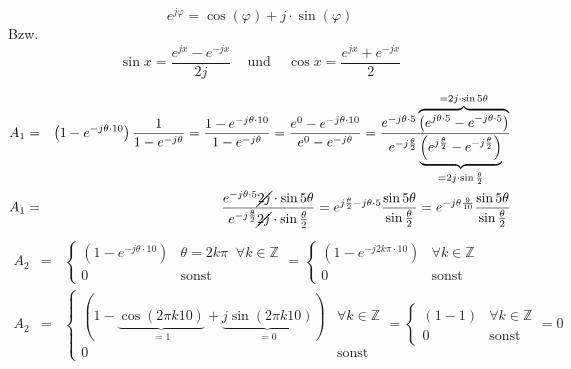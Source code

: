 \begin{uebsp}
\begin{Answer}
\begin{enumerate}[a)]
                \begin{definition}
                    \[e^{j\varphi}=\cos(\varphi)+j\cdot\sin(\varphi)\]
                    Bzw. 
                    \[\sin x = \frac{e^{jx} - e^{-jx}}{2j}\;\;\;\text{ und
                        }\;\;\;\cos x = \frac{e^{jx} + e^{-jx}}{2}\]
                \end{definition}
                \begin{eqnarray*}A_1&=&\left(1-e^{-j\theta\cdot
                10}\right)\frac{1}{1-e^{-j\theta}}=\frac{1-e^{-j\theta\cdot
                10}}{1-e^{-j\theta}}=\frac{e^0-e^{-j\theta\cdot
                10}}{e^0-e^{-j\theta}}=
                \frac{e^{-j\theta\cdot5}\overbrace{\left(e^{j\theta\cdot 5}-e^{-j\theta\cdot
                5}\right)}^{=2j\cdot
            \sin5\theta}}{e^{-j\frac{\theta}{2}}\underbrace{\left(e^{j\frac{\theta}{2}}-e^{-j\frac{\theta}{2}}\right)}_{=2j\cdot
            \sin\frac{\theta}{2}}}\\
            A_1&=&\frac{e^{-j\theta\cdot5}{\cancel{2j}\cdot
    \sin5\theta}}{e^{-j\frac{\theta}{2}}{\cancel{2j}\cdot \sin\frac{\theta}{2}}}=
                e^{j\frac{\theta}{2}-j\theta\cdot5}\frac{{
    \sin5\theta}}{{\sin\frac{\theta}{2}}}=
                e^{-j\theta\frac{9}{10}}\frac{
    \sin5\theta}{\sin\frac{\theta}{2}}
                \end{eqnarray*}
            \begin{eqnarray*}
                A_2&=&\begin{cases}\left(1-e^{-j\theta\cdot
                10}\right)&\theta=2k\pi\;\;\forall
                        k\in\mathbb{Z}\\0&\text{sonst}\end{cases}=
                                \begin{cases}\left(1-e^{-j2k\pi\cdot
                10}\right)&\forall k\in\mathbb{Z}\\0&\text{sonst}\end{cases}\\
                A_2&=&
                \begin{cases}\left(1-\underbrace{\cos(2\pi k
            10)}_{=1}+\underbrace{j\sin(2\pi k 10)}_{=0}\right)&\forall
                    k\in\mathbb{Z}\\0&\text{sonst}\end{cases}=\begin{cases}\left(1-1\right)&\forall
                    k\in\mathbb{Z}\\0&\text{sonst}\end{cases}=0
            \end{eqnarray*}


\end{enumerate}
\end{Answer}
\end{uebsp}

